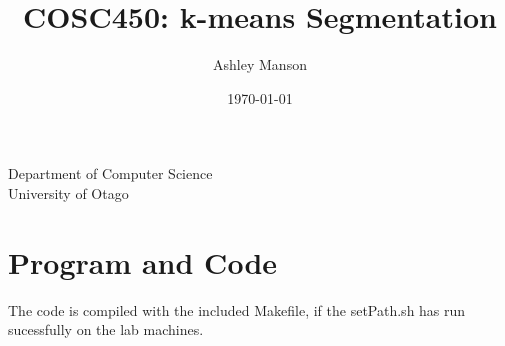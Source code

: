 \documentclass{article}
\begin{document}
\title{COSC450: k-means Segmentation}
\author{Ashley Manson}
\date{\today}

\begin{titlepage}
\clearpage
\maketitle
\thispagestyle{empty} %

\begin{center}

\vspace*{1\baselineskip} %

Department of Computer Science\\
University of Otago

\end{center}

\end{titlepage}


\section{Program and Code}
The code is compiled with the included Makefile, if the setPath.sh has run
sucessfully on the lab machines.\\ 
\end{document}
